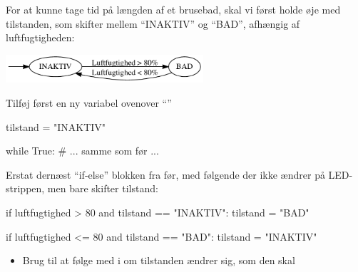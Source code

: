 \documentclass{ucph-handout}
\newcounter{handout}
\newcommand{\Ark}{Arbejdsark \arabic{handout}: }
\renewcommand{\Title}{\Ark LED-strip}%
\begin{document}
\newpage
{}
\renewcommand{\Title}{\Ark Tidstagning}
\begin{exercisebox}[adjusted title=Tilstande]
  For at kunne tage tid på længden af et brusebad, skal vi først holde
  øje med tilstanden, som skifter mellem "`INAKTIV"' og "`BAD"', afhængig af luftfugtigheden:

 \quad\quad\includegraphics[width=0.55\textwidth]{graphviz/basic.pdf}
  
Tilføj først en ny variabel ovenover "`"'
\begin{python}
tilstand = "INAKTIV"

while True:
    # ... samme som før ...
\end{python}

Erstat dernæst "`if-else"' blokken fra før, med følgende der ikke ændrer på LED-strippen, men bare skifter tilstand:
\begin{python}
if luftfugtighed > 80 and tilstand == "INAKTIV":
    tilstand = "BAD"

if luftfugtighed <= 80 and tilstand == "BAD":
    tilstand = "INAKTIV"
\end{python}

\begin{itemize}
\item Brug  til at følge med i om tilstanden ændrer sig, som den skal
\end{itemize}
\end{exercisebox}
\end{document}
